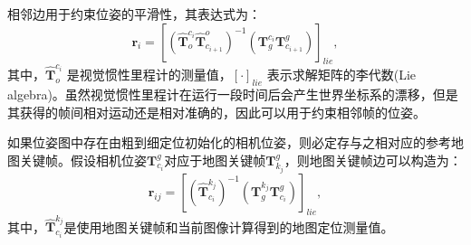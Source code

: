 相邻边用于约束位姿的平滑性，其表达式为：
\begin{equation}
    \symbf{r}_i = [(\hat{\symbf{T}}^{c_i}_{o} \hat{\symbf{T}}^{o}_{c_{i+1}})^{-1} (\symbf{T}^{c_{i}}_g \symbf{T}_{c_{i+1}}^g)]_{lie},
\end{equation}
其中，$\hat{\symbf{T}}^{c_i}_{o}$ 是视觉惯性里程计的测量值，$[\cdot]_{lie}$ 表示求解矩阵的李代数(Lie algebra)\cite{bourbaki1989lie}。虽然视觉惯性里程计在运行一段时间后会产生世界坐标系的漂移，但是其获得的帧间相对运动还是相对准确的，因此可以用于约束相邻帧的位姿。

如果位姿图中存在由粗到细定位初始化的相机位姿，则必定存与之相对应的参考地图关键帧。假设相机位姿$\symbf{T}_{c_{i}}^g$对应于地图关键帧$\symbf{T}_{k_{j}}^g$，则地图关键帧边可以构造为：
\begin{equation}
    \symbf{r}_{ij} = [(\hat{\symbf{T}}^{k_j}_{c_{i}})^{-1} (\symbf{T}^{k_{j}}_g \symbf{T}_{c_{i}}^g)]_{lie},
\end{equation}
其中，$\hat{\symbf{T}}^{k_j}_{c_{i}}$是使用地图关键帧和当前图像计算得到的地图定位测量值。

